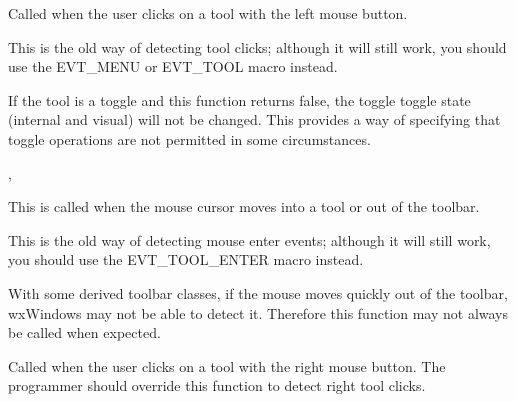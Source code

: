 Called when the user clicks on a tool with the left mouse button.

This is the old way of detecting tool clicks; although it will still work,
you should use the EVT\_MENU or EVT\_TOOL macro instead.





If the tool is a toggle and this function returns false, the toggle
toggle state (internal and visual) will not be changed. This provides a way of
specifying that toggle operations are not permitted in some circumstances.


,\rtfsp
{}

\label{wxtoolbaronmouseenter}


This is called when the mouse cursor moves into a tool or out of
the toolbar.

This is the old way of detecting mouse enter events; although it will still work,
you should use the EVT\_TOOL\_ENTER macro instead.




With some derived toolbar classes, if the mouse moves quickly out of the toolbar, wxWindows may not be able to
detect it. Therefore this function may not always be called when expected.

\label{wxtoolbaronrightclick}


Called when the user clicks on a tool with the right mouse button. The
programmer should override this function to detect right tool clicks.


